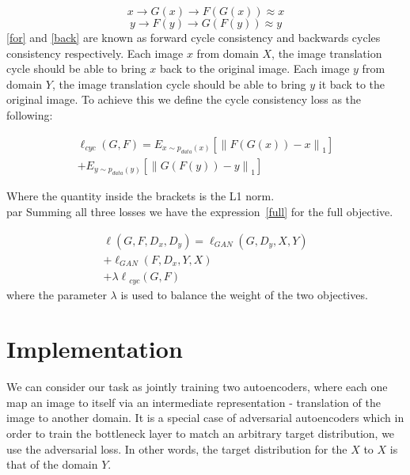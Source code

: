 \documentclass[]{IEEEtran}
\begin{document}
\begin{equation}
x\rightarrow G(x)\rightarrow F(G(x))\approx x
\label{for}
\end{equation}
\begin{equation}
y\rightarrow F(y)\rightarrow G(F(y))\approx y
\label{back}
\end{equation}
\ref{for} and \ref{back} are known as forward cycle consistency and backwards cycles consistency respectively. Each image $x$ from domain $X$, the image translation cycle should be able to bring $x$ back to the original image.  Each image $y$ from domain $Y$, the image translation cycle should be able to bring $y$ it back to the original image. To achieve this we define the cycle consistency loss as the following:

\begin{equation}
\begin{split}
\ell _{ cyc }(G,F)={ E }_{ x\sim p_{ { data } }(x) }\left[ { \left\| F(G(x))-x \right\|  }_{ 1 } \right] \\
+{ E }_{ y\sim p_{ { data } }(y) }\left[ { \left\| G(F(y))-y \right\|  }_{ 1 } \right] 
\label{cyc}
\end{split}
\end{equation}

Where the quantity inside the brackets is the L1 norm.\\par
Summing all three losses we have the expression~\ref{full} for the full objective.

\begin{equation}
\begin{split}
\ell (G,F,{ D }_{ x },{ D }_{ y })={ \ell  }_{ GAN }(G,{ D }_{ y },X,Y)\\
+{ \ell  }_{ GAN }(F,{ D }_{ x },{ Y,X })\\
+{\lambda \ell  }_{ cyc }(G,F)
\label{full}
\end{split}
\end{equation}
where the parameter $\lambda $ is used to balance the weight of the two objectives.

\section{Implementation}
We can consider our task as jointly training two autoencoders, where each one map an image to itself via an intermediate representation - translation of the image to another domain. It is a special case of adversarial autoencoders which in order to train the bottleneck layer to match an arbitrary target distribution, we use the adversarial loss. In other words, the target distribution for the $X$ to $X$ is that of the domain $Y$. 
\end{document}
